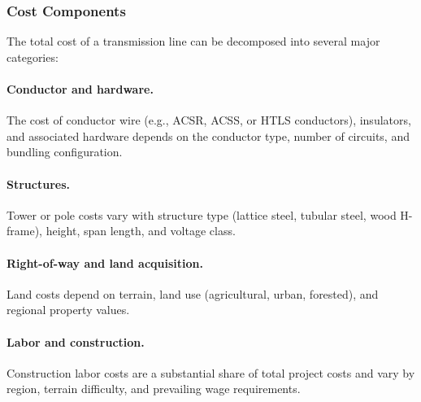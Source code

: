 \documentclass[12pt]{article}
\begin{document}
\subsubsection{Cost Components}

The total cost of a transmission line can be decomposed into several major categories:


\paragraph{Conductor and hardware.} The cost of conductor wire (e.g., ACSR, ACSS, or HTLS conductors), insulators, and associated hardware depends on the conductor type, number of circuits, and bundling configuration. %

\paragraph{Structures.} Tower or pole costs vary with structure type (lattice steel, tubular steel, wood H-frame), height, span length, and voltage class. %

\paragraph{Right-of-way and land acquisition.} Land costs depend on terrain, land use (agricultural, urban, forested), and regional property values. %

\paragraph{Labor and construction.} Construction labor costs are a substantial share of total project costs and vary by region, terrain difficulty, and prevailing wage requirements. %
\end{document}
